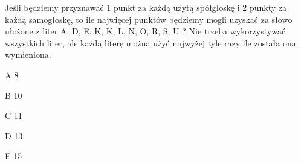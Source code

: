 \begin{tresc}
Jeśli będziemy przyznawać 1 punkt za każdą użytą spółgłoskę i 2 punkty za każdą samogłoskę, to ile najwięcej punktów będziemy mogli uzyskać za słowo ułożone z liter A, D, E, K, K, L, N, O, R, S, U ? Nie trzeba wykorzystywać wszystkich liter, ale każdą literę można użyć najwyżej tyle razy ile została ona wymieniona.
\end{tresc}
\begin{wariant}{A} 8 \end{wariant}
\begin{wariant}{B} 10 \end{wariant}
\begin{wariant}{C} 11 \end{wariant}
\begin{wariant}{D} 13 \end{wariant}
\begin{wariant}{E} 15 \end{wariant}
